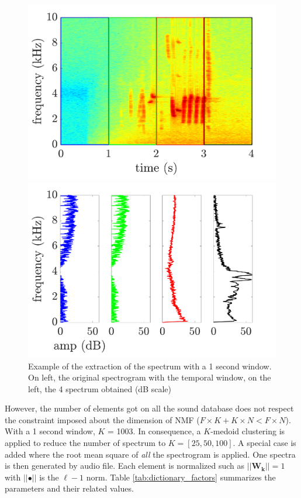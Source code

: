 \documentclass[twocolumn,a4paper,10pt]{article}
\begin{document}
\begin{figure}[!t]
\centering
	\begin{minipage}[t]{.24\textwidth}
		\centering
		\includegraphics[width=\linewidth]{../image/extractionDictionary1Example.pdf}
	\end{minipage}
	\begin{minipage}[t]{.24\textwidth}
		\centering
		\includegraphics[width=\linewidth]{../image/extractionDictionary2Example.pdf}
	\end{minipage}
	\caption{Example of the extraction of the spectrum with a 1 second window. On left, the original spectrogram with the temporal window, on the left, the 4 spectrum obtained (dB scale)}
	\label{fig:dictionaryExtraction}
\end{figure}

However, the number of elements got on all the sound database does not respect the constraint imposed about the dimension of NMF ($F \times K + K \times N < F \times N$). With a 1 second window, $K$ = 1003. In consequence, a $K$-medoid clustering is applied to reduce the number of spectrum to $K = \left[ 25, 50, 100 \right]$. A special case is added where the root mean square of \textit{all} the spectrogram is applied. One spectra is then generated by audio file.
Each element is normalized such as $\vert \vert \mathbf{W_k} \vert \vert = 1$ with $\vert \vert \bullet \vert\vert$ is the $\ell-1$ norm. Table \ref{tab:dictionary_factors} summarizes the parameters and their related values.
\end{document}
